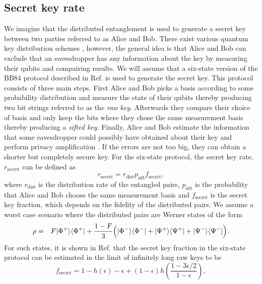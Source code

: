 \subsection{Secret key rate} \label{sec:secret}
We imagine that the distributed entanglement is used to generate a secret key
between two parties referred to as Alice and Bob. There exist various quantum
key distribution schemes \cite{scarani,bennett2,ekert,bruss}, however, the
general idea is that Alice and Bob can exclude that an eavesdropper has any
information about the key by measuring their qubits and compairing results. We
will assume that a six-state version of the BB84 protocol described in Ref.
\cite{bruss} is used to generate the secret key. This protocol consists of three
main steps. First Alice and Bob picks a basis according to some probability
distribution and measure the state of their qubits thereby producing two bit
strings referred to as the \emph{raw key}. Afterwards they compare their choice
of basis and only keep the bits where they chose the same measurement basis
thereby producing a \emph{sifted key}. Finally, Alice and Bob estimate the
information that some eavesdropper could possibly have obtained about their key
and perform privacy amplification \cite{scarani}. If the errors are not too big,
they can obtain a shorter but completely secure key.  For the six-state
protocol, the secret key rate, $r_{\text{secret}}$ can be defined as
\begin{equation}
r_{\text{secret}}=r_{\text{dist}}p_{\text{sift}}f_{\text{secret}},
\end{equation}
where $r_{\text{dist}}$ is the distribution rate of the entangled pairs,
$p_{\text{sift}}$ is the probability that Alice and Bob choose the same
measurement basis and $f_{\text{secret}}$ is the secret key fraction, which
depends on the fidelity of the distributed pairs. We assume a worst case
scenario where the distributed pairs are Werner states of the form
\begin{eqnarray}
\rho&=&F| \Phi^{+} \rangle\langle \Phi^{+} | +
\frac{1-F}{3}\Big(| \Phi^{-} \rangle\langle \Phi^{-} |
+| \Psi^{+} \rangle\langle \Psi^{+} |+| \Psi^{-} \rangle\langle \Psi^{-} |\Big).
\end{eqnarray}
For such states, it is shown in Ref. \cite{scarani} that the secret key fraction
in the six-state protocol can be estimated in the limit of infinitely long raw
keys to be
\begin{equation} \label{eq:secret2}
f_{\text{secret}}=1-h(\epsilon)-\epsilon+(1-\epsilon)
h\left(\frac{1-3\epsilon/2}{1-\epsilon}\right),
\end{equation} 

